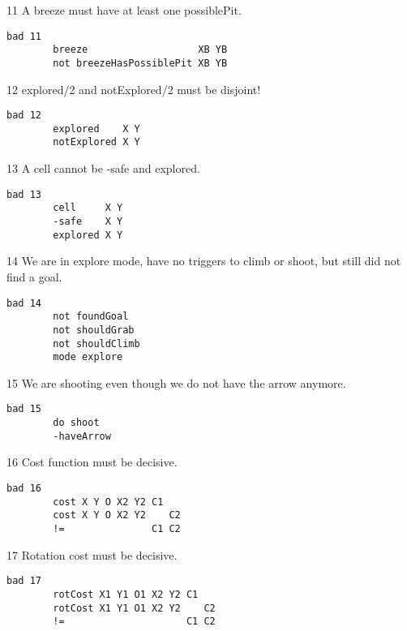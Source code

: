 11 A breeze must have at least one possiblePit.

\begin{verbatim}
bad 11
        breeze                   XB YB
        not breezeHasPossiblePit XB YB
\end{verbatim}

12 explored/2 and notExplored/2 must be disjoint!

\begin{verbatim}
bad 12
        explored    X Y
        notExplored X Y
\end{verbatim}

13 A cell cannot be -safe and explored.

\begin{verbatim}
bad 13
        cell     X Y
        -safe    X Y
        explored X Y
\end{verbatim}

14 We are in explore mode, have no triggers to climb or shoot, but still
did not find a goal.

\begin{verbatim}
bad 14
        not foundGoal
        not shouldGrab
        not shouldClimb
        mode explore
\end{verbatim}

15 We are shooting even though we do not have the arrow anymore.

\begin{verbatim}
bad 15
        do shoot
        -haveArrow
\end{verbatim}

16 Cost function must be decisive.

\begin{verbatim}
bad 16
        cost X Y O X2 Y2 C1
        cost X Y O X2 Y2    C2
        !=               C1 C2
\end{verbatim}

17 Rotation cost must be decisive.

\begin{verbatim}
bad 17
        rotCost X1 Y1 O1 X2 Y2 C1
        rotCost X1 Y1 O1 X2 Y2    C2
        !=                     C1 C2
\end{verbatim}

